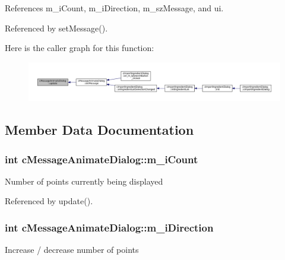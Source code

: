 References m\+\_\+i\+Count, m\+\_\+i\+Direction, m\+\_\+sz\+Message, and ui.



Referenced by set\+Message().



Here is the caller graph for this function\+:
\nopagebreak
\begin{figure}[H]
\begin{center}
\leavevmode
\includegraphics[width=350pt]{classc_message_animate_dialog_a09ea517229b2b01be6dc407911628441_icgraph}
\end{center}
\end{figure}




\subsection{Member Data Documentation}
\subsubsection[{\texorpdfstring{m\+\_\+i\+Count}{m_iCount}}]{\setlength{\rightskip}{0pt plus 5cm}int c\+Message\+Animate\+Dialog\+::m\+\_\+i\+Count\hspace{0.3cm}{\ttfamily [protected]}}\hypertarget{classc_message_animate_dialog_a0208fa559f41307f125fa7f80b97871a}{}\label{classc_message_animate_dialog_a0208fa559f41307f125fa7f80b97871a}
Number of points currently being displayed 

Referenced by update().

\subsubsection[{\texorpdfstring{m\+\_\+i\+Direction}{m_iDirection}}]{\setlength{\rightskip}{0pt plus 5cm}int c\+Message\+Animate\+Dialog\+::m\+\_\+i\+Direction\hspace{0.3cm}{\ttfamily [protected]}}\hypertarget{classc_message_animate_dialog_a3f26bb00ddbedafdfad24c0c3a7fdfdc}{}\label{classc_message_animate_dialog_a3f26bb00ddbedafdfad24c0c3a7fdfdc}
Increase / decrease number of points 

